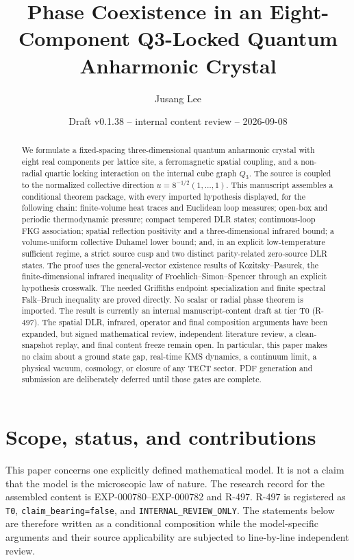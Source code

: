 \documentclass[11pt]{article}
\title{Phase Coexistence in an Eight-Component Q3-Locked Quantum Anharmonic Crystal}
\author{Jusang Lee}
\date{Draft v0.1.38 -- internal content review -- 2026-09-08}
\numberwithin{equation}{section}
\theoremstyle{definition}
\begin{document}
\maketitle

\begin{abstract}
We formulate a fixed-spacing three-dimensional quantum anharmonic crystal
with eight real components per lattice site, a ferromagnetic spatial coupling,
and a non-radial quartic locking interaction on the internal cube graph
$Q_3$.  The source is coupled to the normalized collective direction
$u=8^{-1/2}(1,\ldots,1)$.  This manuscript assembles a conditional theorem
package, with every imported hypothesis displayed, for the following chain:
finite-volume heat traces and Euclidean loop measures; open-box and periodic
thermodynamic pressure; compact tempered DLR states; continuous-loop FKG
association; spatial reflection positivity and a three-dimensional infrared
bound; a volume-uniform collective Duhamel lower bound; and, in an explicit
low-temperature sufficient regime, a strict source cusp and two distinct
parity-related zero-source DLR states.  The proof uses the general-vector
existence results of Kozitsky--Pasurek, the finite-dimensional infrared
inequality of Froehlich--Simon--Spencer through an explicit hypothesis
crosswalk.  The needed Griffiths endpoint specialization and finite spectral
Falk--Bruch inequality are proved directly.  No scalar or
radial phase theorem is imported.  The result is currently an internal
manuscript-content draft at tier T0 (R-497). The spatial DLR, infrared,
operator and final composition arguments have been expanded, but signed mathematical review,
independent literature review, a clean-snapshot replay, and final content
freeze remain open.  In particular, this paper makes no claim about a ground
state gap, real-time KMS dynamics, a continuum limit, a physical vacuum,
cosmology, or closure of any TECT sector.  PDF generation and submission are
deliberately deferred until those gates are complete.
\end{abstract}

\section{Scope, status, and contributions}

This paper concerns one explicitly defined mathematical model.  It is not a
claim that the model is the microscopic law of nature.  The research record
for the assembled content is EXP-000780--EXP-000782 and R-497.  R-497 is
registered as \texttt{T0}, \texttt{claim\_bearing=false}, and
\texttt{INTERNAL\_REVIEW\_ONLY}.  The statements below are therefore written
as a conditional composition while the model-specific arguments and their
source applicability are subjected to line-by-line independent review.
\end{document}
